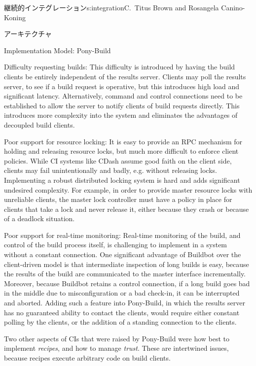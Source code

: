 \begin{aosachapter}{継続的インテグレーション}{s:integration}{C.\ Titus Brown and Rosangela Canino-Koning}
\begin{aosasect1}{アーキテクチャ}
\begin{aosasect2}{Implementation Model: Pony-Build}
\begin{aosadescription}

  \item{Difficulty requesting builds:} This difficulty is
  introduced by having the build clients be entirely independent of
  the results server. Clients may poll the results server, to see if
  a build request is operative, but this introduces high load and
  significant latency. Alternatively, command and control
  connections need to be established to allow the server to notify
  clients of build requests directly. This introduces more
  complexity into the system and eliminates the advantages of
  decoupled build clients.

  \item{Poor support for resource locking:} It is easy to
  provide an RPC mechanism for holding and releasing resource locks,
  but much more difficult to enforce client policies. While CI
  systems like CDash assume good faith on the client side, clients
  may fail unintentionally and badly, e.g. without releasing
  locks. Implementing a robust distributed locking system is hard
  and adds significant undesired complexity. For example, in order
  to provide master resource locks with unreliable clients, the
  master lock controller must have a policy in place for clients
  that take a lock and never release it, either because they crash
  or because of a deadlock situation.

  \item{Poor support for real-time monitoring:} Real-time
  monitoring of the build, and control of the build process
  itself, is challenging to implement in a system without a constant
  connection. One significant advantage of Buildbot over the
  client-driven model is that intermediate inspection of long builds
  is easy, because the results of the build are communicated to the
  master interface incrementally. Moreover, because Buildbot retains
  a control connection, if a long build goes bad in the middle
  due to misconfiguration or a bad check-in, it can be interrupted
  and aborted. Adding such a feature into Pony-Build, in which the
  results server has no guaranteed ability to contact the clients,
  would require either constant polling by the clients, or the
  addition of a standing connection to the clients.

\end{aosadescription}

Two other aspects of CIs that were raised by Pony-Build were how best
to implement \emph{recipes}, and how to manage \emph{trust}. These are
intertwined issues, because recipes execute arbitrary code on build
clients.


\end{aosasect2}
\end{aosasect1}
\end{aosachapter}
